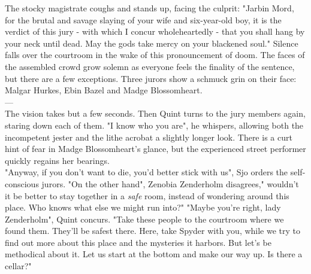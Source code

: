 The stocky magistrate coughs and stands up, facing the culprit: "Jarbin Mord, for the brutal and savage slaying of your wife and six-year-old boy, it is the verdict of this jury - with which I concur wholeheartedly - that you shall hang by your neck until dead. May the gods take mercy on your blackened soul." Silence falls over the courtroom in the wake of this pronouncement of doom. The faces of the assembled crowd grow solemn as everyone feels the finality of the sentence, but there are a few exceptions. Three jurors show a schmuck grin on their face: Malgar Hurkes, Ebin Bazel and Madge Blossomheart.\\

---\\

The vision takes but a few seconds. Then Quint turns to the jury members again, staring down each of them. "I know who you are", he whispers, allowing both the incompetent jester and the lithe acrobat a slightly longer look. There is a curt hint of fear in Madge Blossomheart's glance, but the experienced street performer quickly regains her bearings.\\

"Anyway, if you don't want to die, you'd better stick with us", Sjo orders the self-conscious jurors. "On the other hand", Zenobia Zenderholm disagrees," wouldn't it be better to stay together in a {\itshape safe} room, instead of wondering around this place. Who knows what else we might run into?" "Maybe you're right, lady Zenderholm", Quint concurs. "Take these people to the courtroom where we found them. They'll be safest there. Here, take Spyder with you, while we try to find out more about this place and the mysteries it harbors. But let's be methodical about it. Let us start at the bottom and make our way up. Is there a cellar?"\\

